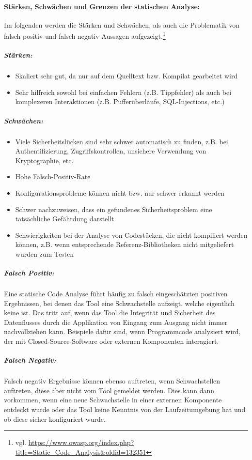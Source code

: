 \paragraph{Stärken, Schwächen und Grenzen der statischen Analyse:}
Im folgenden werden die Stärken und Schwächen, als auch die Problematik von falsch positiv und falsch negativ Aussagen aufgezeigt.\footnote{vgl. \url{https://www.owasp.org/index.php?title=Static_Code_Analysis\&oldid=132351}}
\subparagraph{Stärken:}
\begin{itemize}
\item Skaliert sehr gut, da nur auf dem Quelltext bzw. Kompilat gearbeitet wird
\item Sehr hilfreich sowohl bei einfachen Fehlern (z.B. Tippfehler) als auch bei komplexeren Interaktionen (z.B. Pufferüberläufe, SQL-Injections, etc.)
\end{itemize}

\subparagraph{Schwächen:}
\begin{itemize}
\item Viele Sicherheitslücken sind sehr schwer automatisch zu finden, z.B. bei Authentifizierung, Zugriffskontrollen, unsichere Verwendung von Kryptographie, etc.
\item Hohe Falsch-Positiv-Rate
\item Konfigurationsprobleme können nicht bzw. nur schwer erkannt werden
\item Schwer nachzuweisen, dass ein gefundenes Sicherheitsproblem eine tatsächliche Gefährdung darstellt
\item Schwierigkeiten bei der Analyse von Codestücken, die nicht kompiliert werden können, z.B. wenn entsprechende Referenz-Bibliotheken nicht mitgeliefert wurden zum Testen
\end{itemize}

\subparagraph{Falsch Positiv:}
Eine statische Code Analyse führt häufig zu falsch eingeschätzten positiven Ergebnissen, bei denen das Tool eine Schwachstelle aufzeigt, welche eigentlich keine ist. Das tritt auf, wenn das Tool die Integrität und Sicherheit des Datenflusses durch die Applikation von Eingang zum Ausgang nicht immer nachvollziehen kann. Beispiele dafür sind, wenn Programmcode analysiert wird, der mit Closed-Source-Software oder externen Komponenten interagiert.

\subparagraph{Falsch Negativ:}
Falsch negativ Ergebnisse können ebenso auftreten, wenn Schwachstellen auftreten, diese aber nicht vom Tool gemeldet werden. Dies kann dann vorkommen, wenn eine neue Schwachstelle in einer externen Komponente entdeckt wurde oder das Tool keine Kenntnis von der Laufzeitumgebung hat und ob diese sicher konfiguriert wurde.

